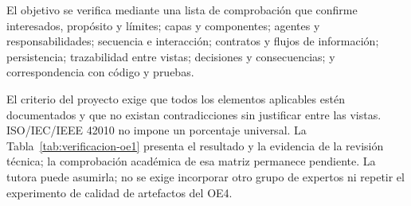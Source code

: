 El objetivo se verifica mediante una lista de comprobación que confirme interesados, propósito y límites; capas y componentes; agentes y responsabilidades; secuencia e interacción; contratos y flujos de información; persistencia; trazabilidad entre vistas; decisiones y consecuencias; y correspondencia con código y pruebas.

El criterio del proyecto exige que todos los elementos aplicables estén documentados y que no existan contradicciones sin justificar entre las vistas. ISO/IEC/IEEE 42010 no impone un porcentaje universal. La Tabla~\ref{tab:verificacion-oe1} presenta el resultado y la evidencia de la revisión técnica; la comprobación académica de esa matriz permanece pendiente. La tutora puede asumirla; no se exige incorporar otro grupo de expertos ni repetir el experimento de calidad de artefactos del OE4.
